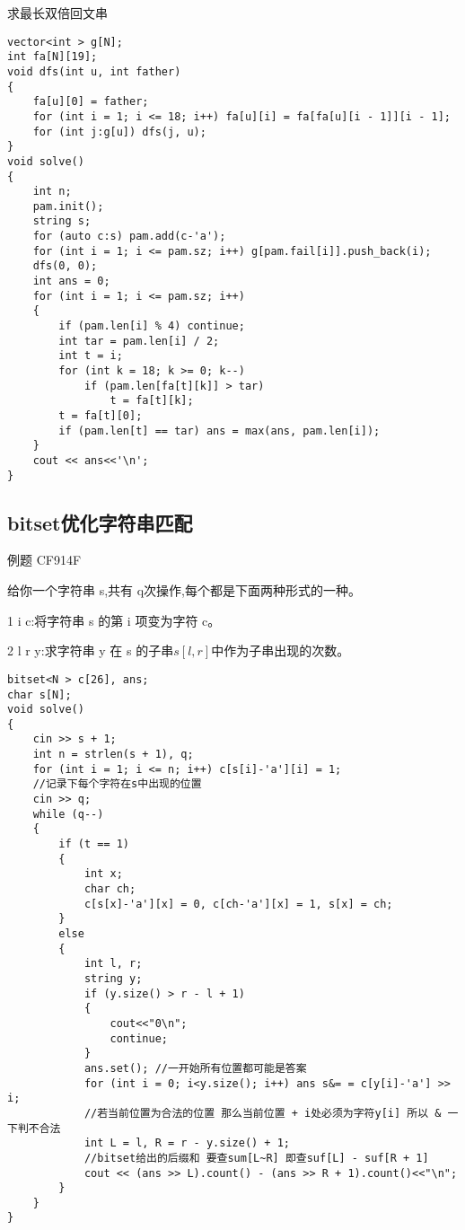 \documentclass[a4paper, fontset=none]{ctexart}
\begin{document}
求最长双倍回文串

\begin{verbatim}
vector<int > g[N];
int fa[N][19];
void dfs(int u, int father)
{
    fa[u][0] = father;
    for (int i = 1; i <= 18; i++) fa[u][i] = fa[fa[u][i - 1]][i - 1];
    for (int j:g[u]) dfs(j, u);
}
void solve()
{
    int n;
    pam.init();
    string s;
    for (auto c:s) pam.add(c-'a');
    for (int i = 1; i <= pam.sz; i++) g[pam.fail[i]].push_back(i);
    dfs(0, 0);
    int ans = 0;
    for (int i = 1; i <= pam.sz; i++)
    {
        if (pam.len[i] % 4) continue;
        int tar = pam.len[i] / 2;
        int t = i;
        for (int k = 18; k >= 0; k--)
            if (pam.len[fa[t][k]] > tar)
                t = fa[t][k];
        t = fa[t][0];
        if (pam.len[t] == tar) ans = max(ans, pam.len[i]);
    }
    cout << ans<<'\n';
}
\end{verbatim}
\subsection{bitset优化字符串匹配}

例题 CF914F

给你一个字符串 s,共有 q次操作,每个都是下面两种形式的一种。

1 i c:将字符串 s 的第 i 项变为字符 c。

2 l r y:求字符串 y 在 s 的子串$s [l , r]$中作为子串出现的次数。

\begin{verbatim}
bitset<N > c[26], ans;
char s[N];
void solve()
{
    cin >> s + 1;
    int n = strlen(s + 1), q;
    for (int i = 1; i <= n; i++) c[s[i]-'a'][i] = 1;
    //记录下每个字符在s中出现的位置
    cin >> q;
    while (q--)
    {
        if (t == 1)
        {
            int x;
            char ch;
            c[s[x]-'a'][x] = 0, c[ch-'a'][x] = 1, s[x] = ch;
        }
        else
        {
            int l, r;
            string y;
            if (y.size() > r - l + 1)
            {
                cout<<"0\n";
                continue;
            }
            ans.set(); //一开始所有位置都可能是答案
            for (int i = 0; i<y.size(); i++) ans s&= = c[y[i]-'a'] >> i;
            //若当前位置为合法的位置 那么当前位置 + i处必须为字符y[i] 所以 & 一下判不合法
            int L = l, R = r - y.size() + 1;
            //bitset给出的后缀和 要查sum[L~R] 即查suf[L] - suf[R + 1]
            cout << (ans >> L).count() - (ans >> R + 1).count()<<"\n";
        }
    }
}
\end{verbatim}
\end{document}

